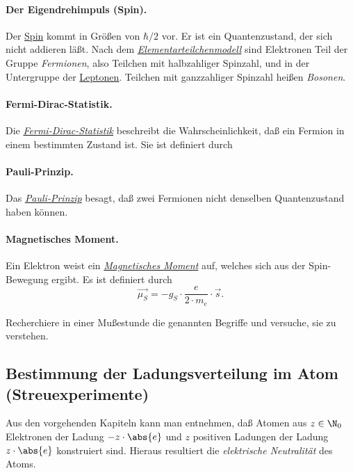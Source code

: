 \documentclass[]{subfiles}
\begin{document}
            \paragraph*{Der Eigendrehimpuls (Spin).} Der \href{https://de.wikipedia.org/wiki/Spin}{Spin} kommt in Größen von $\hbar/2$ vor. Er ist ein Quantenzustand, der sich nicht addieren läßt. Nach dem \href{https://de.wikipedia.org/wiki/Standardmodell_der_Teilchenphysik}{\emph{Elementarteilchenmodell}} sind Elektronen Teil der Gruppe \emph{Fermionen}, also Teilchen mit halbzahliger Spinzahl, und in der Untergruppe der \href{https://de.wikipedia.org/wiki/Lepton}{Leptonen}. Teilchen mit ganzzahliger Spinzahl heißen \emph{Bosonen}. 

            \paragraph*{Fermi-Dirac-Statistik.} Die \href{https://de.wikipedia.org/wiki/Fermi-Dirac-Statistik}{\emph{Fermi-Dirac-Statistik}} beschreibt die Wahrscheinlichkeit, daß ein Fermion in einem bestimmten Zustand ist. Sie ist definiert durch 

            \paragraph*{Pauli-Prinzip.} Das \href{https://de.wikipedia.org/wiki/Pauli-Prinzip}{\emph{Pauli-Prinzip}} besagt, daß zwei Fermionen nicht denselben Quantenzustand haben können.

            \paragraph*{Magnetisches Moment.} Ein Elektron weist ein \href{https://de.wikipedia.org/wiki/Magnetisches_Moment}{\emph{Magnetisches Moment}} auf, welches sich aus der Spin-Bewegung ergibt. Es ist definiert durch
            \[\vec{\mu_S} = -g_S\cdot \frac{e}{2\cdot m_e}\cdot\vec{s}.\]

            \begin{Aufgabe}
                \nr{} Recherchiere in einer Mußestunde die genannten Begriffe und versuche, sie zu verstehen.
            \end{Aufgabe}

    \subsection{Bestimmung der Ladungsverteilung im Atom (Streuexperimente)}
        Aus den vorgehenden Kapiteln kann man entnehmen, daß Atomen aus $z\in\N_0$ Elektronen der Ladung $-z\cdot \abs{e}$ und $z$ positiven Ladungen der Ladung $z\cdot\abs{e}$ konstruiert sind. Hieraus resultiert die \emph{elektrische Neutralität} des Atoms. 
\end{document}
